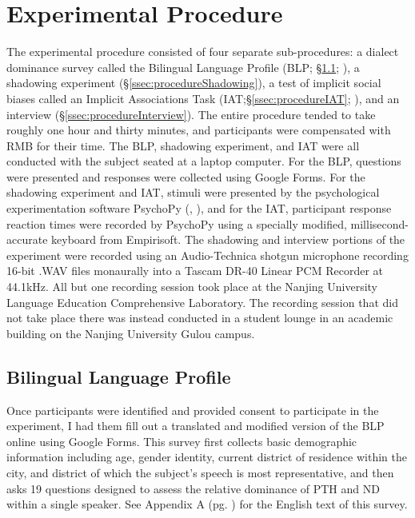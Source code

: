 \section{Experimental Procedure}
\label{sec:procedure}
The experimental procedure consisted of four separate sub-procedures: a dialect dominance survey called the Bilingual Language Profile (BLP; \S\ref{ssec:procedureBLP}; \citealt{birdsong2012bilingual}), a shadowing experiment (\S\ref{ssec:procedureShadowing}), a test of implicit social biases called an Implicit Associations Task (IAT;\S\ref{ssec:procedureIAT}; \citealt{greenwald1998measuring,greenwald2003understanding}), and an interview (\S\ref{ssec:procedureInterview}). The entire procedure tended to take roughly one hour and thirty minutes, and participants were compensated with RMB  for their time.  The BLP, shadowing experiment, and IAT were all conducted with the subject seated at a laptop computer. For the BLP, questions were presented and responses were collected using Google Forms. For the shadowing experiment and IAT, stimuli were presented by the psychological experimentation software PsychoPy (\cite{peirce2007psychopy}, \cite{peirce2009generating}), and for the IAT, participant response reaction times were recorded by PsychoPy using a specially modified, millisecond-accurate keyboard from Empirisoft. The shadowing and interview portions of the experiment were recorded using an Audio-Technica shotgun microphone recording 16-bit .WAV files monaurally into a Tascam DR-40 Linear PCM Recorder at 44.1kHz. All but one recording session took place at the Nanjing University Language Education Comprehensive Laboratory. The recording session that did not take place there was instead conducted in a student lounge in an academic building on the Nanjing University Gulou campus.

\subsection{Bilingual Language Profile}
\label{ssec:procedureBLP}
Once participants were identified and provided consent to participate in the experiment, I had them fill out a translated and modified version of the BLP online using Google Forms. This survey first collects basic demographic information including age, gender identity, current district of residence within the city, and district of which the subject’s speech is most representative, and then asks 19 questions designed to assess the relative dominance of PTH and ND within a single speaker. See Appendix A (pg. \pageref{appendix:BLP}) for the English text of this survey.

